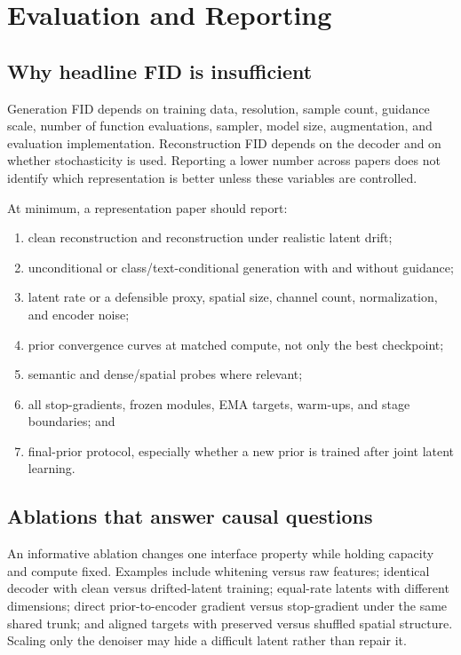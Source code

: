 \documentclass{article}
\begin{document}
\section{Evaluation and Reporting}
\label{sec:evaluation}

\subsection{Why headline FID is insufficient}

Generation FID depends on training data, resolution, sample count, guidance scale, number of function evaluations, sampler, model size, augmentation, and evaluation implementation. Reconstruction FID depends on the decoder and on whether stochasticity is used. Reporting a lower number across papers does not identify which representation is better unless these variables are controlled.

At minimum, a representation paper should report:
\begin{enumerate}[leftmargin=*]
  \item clean reconstruction and reconstruction under realistic latent drift;
  \item unconditional or class/text-conditional generation with and without guidance;
  \item latent rate or a defensible proxy, spatial size, channel count, normalization, and encoder noise;
  \item prior convergence curves at matched compute, not only the best checkpoint;
  \item semantic and dense/spatial probes where relevant;
  \item all stop-gradients, frozen modules, EMA targets, warm-ups, and stage boundaries; and
  \item final-prior protocol, especially whether a new prior is trained after joint latent learning.
\end{enumerate}

\subsection{Ablations that answer causal questions}

An informative ablation changes one interface property while holding capacity and compute fixed. Examples include whitening versus raw features; identical decoder with clean versus drifted-latent training; equal-rate latents with different dimensions; direct prior-to-encoder gradient versus stop-gradient under the same shared trunk; and aligned targets with preserved versus shuffled spatial structure. Scaling only the denoiser may hide a difficult latent rather than repair it.
\end{document}
